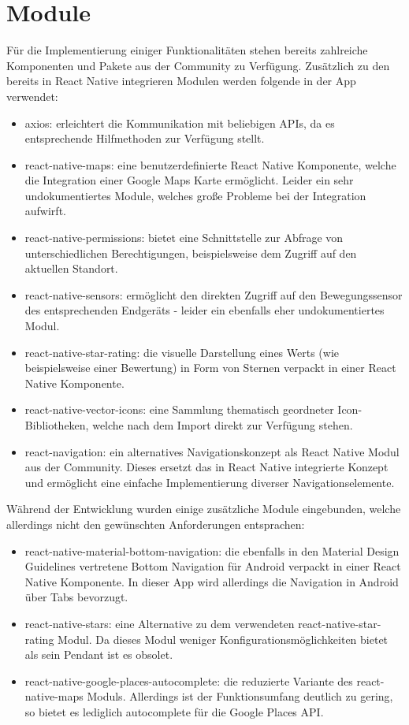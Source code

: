 \section{Module}
Für die Implementierung einiger Funktionalitäten stehen bereits zahlreiche Komponenten und Pakete aus der Community zu Verfügung.
Zusätzlich zu den bereits in React Native integrieren Modulen werden folgende in der App verwendet:
\begin{itemize}
	\item axios: erleichtert die Kommunikation mit beliebigen APIs, da es entsprechende Hilfmethoden zur Verfügung stellt.
	\item react-native-maps: eine benutzerdefinierte React Native Komponente, welche die Integration einer Google Maps Karte ermöglicht. Leider ein sehr undokumentiertes Module, welches große Probleme bei der Integration aufwirft.
	\item react-native-permissions: bietet eine Schnittstelle zur Abfrage von unterschiedlichen Berechtigungen, beispielsweise dem Zugriff auf den aktuellen Standort.
	\item react-native-sensors: ermöglicht den direkten Zugriff auf den Bewegungssensor des entsprechenden Endgeräts - leider ein ebenfalls eher undokumentiertes Modul.
	\item react-native-star-rating: die visuelle Darstellung eines Werts (wie beispielsweise einer Bewertung) in Form von Sternen verpackt in einer React Native Komponente.
	\item react-native-vector-icons: eine Sammlung thematisch geordneter Icon-Bibliotheken, welche nach dem Import direkt zur Verfügung stehen.
	\item react-navigation: ein alternatives Navigationskonzept als React Native Modul aus der Community. Dieses ersetzt das in React Native integrierte Konzept und ermöglicht eine einfache Implementierung diverser Navigationselemente.
\end{itemize}
Während der Entwicklung wurden einige zusätzliche Module eingebunden, welche allerdings nicht den gewünschten Anforderungen entsprachen:
\begin{itemize}
	\item react-native-material-bottom-navigation: die ebenfalls in den Material Design Guidelines vertretene Bottom Navigation für Android verpackt in einer React Native Komponente. In dieser App wird allerdings die Navigation in Android über Tabs bevorzugt.
	\item react-native-stars: eine Alternative zu dem verwendeten react-native-star-rating Modul. Da dieses Modul weniger Konfigurationsmöglichkeiten bietet als sein Pendant ist es obsolet.
	\item react-native-google-places-autocomplete: die reduzierte Variante des react-native-maps Moduls. Allerdings ist der Funktionsumfang deutlich zu gering, so bietet es lediglich autocomplete für die Google Places API.
\end{itemize}
